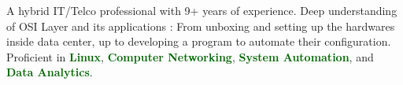 
\begin{cvparagraph}

A hybrid IT/Telco professional with 9+ years of experience. Deep understanding of OSI Layer and its applications : From unboxing and setting up the hardwares inside data center, up to developing a program to automate their configuration. Proficient in \textcolor{darkgreen}{\textbf{Linux}}, \textcolor{darkgreen}{\textbf{Computer Networking}}, \textcolor{darkgreen}{\textbf{System Automation}}, and \textcolor{darkgreen}{\textbf{Data Analytics}}.
\end{cvparagraph}
